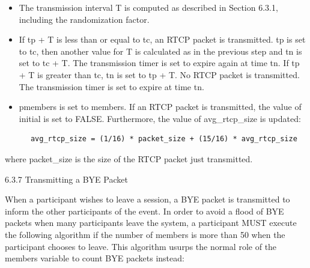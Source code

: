 \documentclass{article}
\begin{document}
\begin{itemize}
\item The transmission interval T is computed as described in Section 6.3.1, including the randomization factor.
\item If tp + T is less than or equal to tc, an RTCP packet is transmitted.  tp is set to tc, then another value for T is calculated as in the previous step and tn is set to tc + T.  The transmission timer is set to expire again at time tn.  If tp + T is greater than tc, tn is set to tp + T.  No RTCP packet is transmitted.  The transmission timer is set to expire at time tn.
\item pmembers is set to members.
If an RTCP packet is transmitted, the value of initial is set to FALSE.  Furthermore, the value of avg\_rtcp\_size is updated:

\end{itemize}
\begin{verbatim}
      avg_rtcp_size = (1/16) * packet_size + (15/16) * avg_rtcp_size
\end{verbatim}

where packet\_size is the size of the RTCP packet just transmitted.

6.3.7 Transmitting a BYE Packet

When a participant wishes to leave a session, a BYE packet is transmitted to inform the other participants of the event.  In order to avoid a flood of BYE packets when many participants leave the system, a participant MUST execute the following algorithm if the number of members is more than 50 when the participant chooses to leave.  This algorithm usurps the normal role of the members variable to count BYE packets instead:
\end{document}
